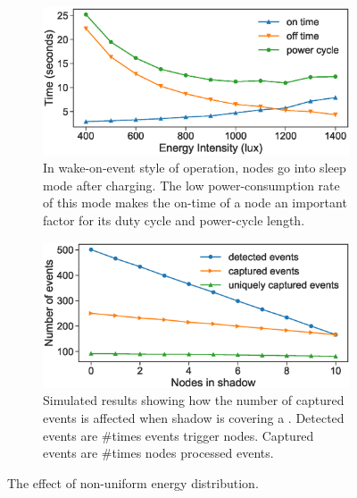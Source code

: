 %
\begin{figure}
    \begin{subfigure}{0.49\columnwidth}
        \includegraphics[width=\textwidth]{figures/BatterylessNodesDutyCycles_Sleep_mode}
        \caption{In wake-on-event style of operation, nodes go into sleep
	mode after charging. The low power-consumption rate of this mode makes
	the on-time of a node an important factor for its duty cycle and
	power-cycle length.}
        \label{fig:differentEnergyIntensity}
    \end{subfigure}\hfill
    \begin{subfigure}{0.49\columnwidth}
        \includegraphics[width=\textwidth]{figures/different_energy_intensity}
        \caption{Simulated results showing how the number of captured events is affected when shadow is covering a \cis. Detected events are \#times events trigger nodes. Captured events are \#times nodes processed events.}
        \label{fig:sim:differentEnergyIntensity}
    \end{subfigure}
    \caption{The effect of non-uniform energy distribution.}
    \label{fig:pwrCycleVSEnergyIntensity}
\end{figure}